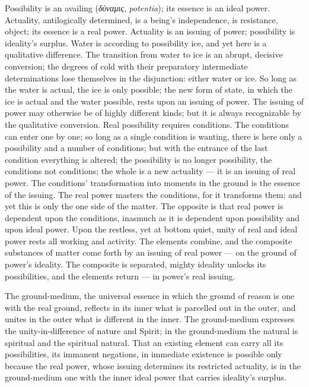 \documentclass[12pt,a4paper]{book}
\begin{document}
Possibility is an availing (\textit{δύναμις}, \textit{potentia}); its essence is an ideal power. Actuality,
antilogically determined, is a being's independence, is resistance, object; its essence is a real power. Actuality is
an issuing of power; possibility is ideality's surplus. Water is according to possibility ice, and yet here is a
qualitative difference. The transition from water to ice is an abrupt, decisive conversion; the degrees of cold with
their preparatory intermediate determinations lose themselves in the disjunction: either water or ice. So long as the
water is actual, the ice is only possible; the new form of state, in which the ice is actual and the water possible,
rests upon an issuing of power. The issuing of power may otherwise be of highly different kinds; but it is always
recognizable by the qualitative conversion. Real possibility requires conditions. The conditions can enter one by one;
so long as a single condition is wanting, there is here only a possibility and a number of conditions; but with the
entrance of the last condition everything is altered; the possibility is no longer possibility, the conditions not
conditions; the whole is a new actuality --- it is an issuing of real power. The conditions' transformation into
moments in the ground is the essence of the issuing. The real power masters the conditions, for it transforms them;
and yet this is only the one side of the matter. The opposite is that real power is dependent upon the conditions,
inasmuch as it is dependent upon possibility and upon ideal power. Upon the restless, yet at bottom quiet, unity of
real and ideal power rests all working and activity. The elements combine, and the composite substances of matter come
forth by an issuing of real power --- on the ground of power's ideality. The composite is separated, mighty ideality
unlocks its possibilities, and the elements return --- in power's real issuing.

The ground-medium, the universal essence in which the ground of reason is one with the real ground, reflects in
its inner what is parcelled out in the outer, and unites in the outer what is different in the inner. The
ground-medium expresses the unity-in-difference of nature and Spirit; in the ground-medium the natural is
spiritual and the spiritual natural. That an existing element can carry all its possibilities, its immanent
negations, in immediate existence is possible only because the real power, whose issuing determines its
restricted actuality, is in the ground-medium one with the inner ideal power that carries ideality's surplus.
\end{document}
